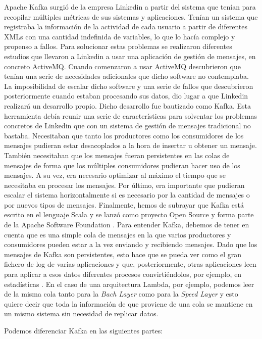 Apache Kafka surgió de la empresa Linkedin a partir del sistema que tenían para recopilar múltiples métricas de sus sistemas y aplicaciones. Tenían un sistema que registraba la información de la actividad de cada usuario a partir de diferentes XMLs con una cantidad indefinida de variables, lo que lo hacía complejo y propenso a fallos. Para solucionar estas problemas se realizaron diferentes estudios que llevaron a Linkedin a usar una aplicación de gestión de mensajes, en concreto ActiveMQ. Cuando comenzaron a usar ActiveMQ descubrieron que tenían una serie de necesidades adicionales que dicho software no contemplaba. La imposibilidad de escalar dicho software y una serie de fallos que descubrieron posteriormente cuando estaban procesando sus datos, dio lugar a que Linkedin realizará un desarrollo propio. Dicho desarrollo fue bautizado como Kafka. Esta herramienta debía reunir una serie de características para solventar los problemas concretos de Linkedin que con un sistema de gestión de mensajes tradicional no bastaba. Necesitaban que tanto los productores como los consumidores de los mensajes pudieran estar desacoplados a la hora de insertar u obtener un mensaje. También necesitaban que los mensajes fueran persistentes en las colas de mensajes de forma que los múltiples consumidores pudieran hacer uso de los mensajes. A su vez, era necesario optimizar al máximo el tiempo que se necesitaba en procesar los mensajes. Por último, era importante que pudieran escalar el sistema horizontalmente si es necesario por la cantidad de mensajes o por nuevos tipos de mensajes. Finalmente, hemos de subrayar que Kafka está escrito en el lenguaje Scala y se lanzó como proyecto Open Source y forma parte de la Apache Software Foundation \cite{Kfk-1}.
Para entender Kafka, debemos de tener en cuenta que es una simple cola de mensajes en la que varios productores y consumidores pueden estar a la vez enviando y recibiendo mensajes. Dado que los mensajes de Kafka son persistentes, esto hace que se pueda ver como el gran fichero de log de varias aplicaciones y que, posteriormente, otras aplicaciones leen para aplicar a esos datos diferentes procesos convirtiéndolos, por ejemplo, en estadísticas \cite{Kfk-6}. En el caso de una arquitectura Lambda, por ejemplo, podemos leer de la misma cola tanto para la \emph{Bach Layer} como para la \emph{Speed Layer} y esto quiere decir que toda la información de que proviene de una cola se mantiene en un mismo sistema sin necesidad de replicar datos.\par

Podemos diferenciar Kafka en las siguientes partes:

